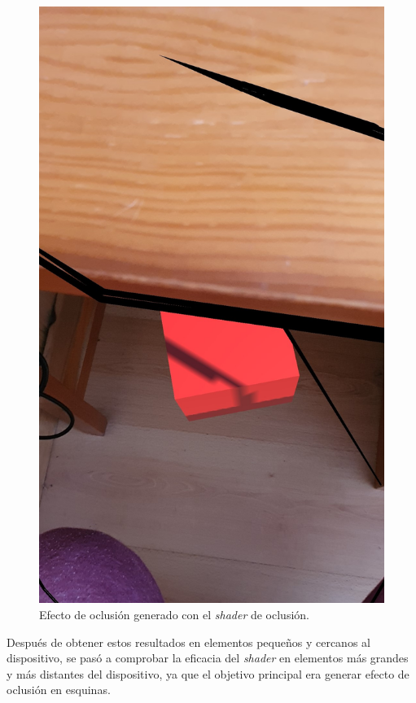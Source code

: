 \begin{figure}[H]
    \centering
    \includegraphics[scale=0.2]{Images/Shaders/oclusionPrueba1.jpg}
    \caption{Efecto de oclusión generado con el \textit{shader} de oclusión.}
    \label{fig:oclusionp1}
\end{figure} 

Después de obtener estos resultados en elementos pequeños y cercanos al dispositivo, se pasó a comprobar la eficacia del \textit{shader} en elementos más grandes y más distantes del dispositivo, ya que el objetivo principal era generar efecto de oclusión en esquinas.\\


